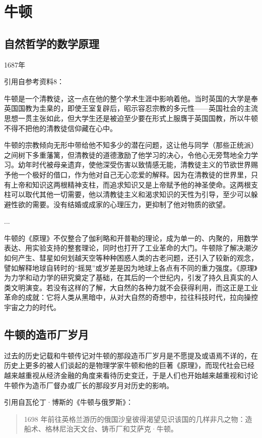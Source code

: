 \documentclass[12pt,oneside]{book}
\begin{document}
\chapter{牛顿}
\section{自然哲学的数学原理}
1687年

引用自参考资料8：
\begin{mdframed}
牛顿是一个清教徒，这一点在他的整个学术生涯中影响着他。当时英国的大学是奉英国国教为圭臬的，即使王室复辟后，昭示容忍宗教的多元性——英国社会的主流思想一贯主张如此，但大学生还是被迫至少要在形式上服膺于英国国教，所以牛顿不得不把他的清教徒信仰藏在心中。

牛顿的宗教倾向无形中带给他不知多少的潜在问题，这让他与同学（那些正统派）之间树下多重藩篱，但清教徒的道德激励了他学习的决心，令他心无旁骛地全力学习。幼年时代被母亲遗弃，使他深受伤害以致情感无能，清教徒主义的节欲世界赐予他一个极好的借口，作为他对自己无心恋爱的解释。因为在清教徒的世界里，只有上帝和知识这两根精神支柱，而追求知识又是上帝赋予他的神圣使命。这两根支柱可以取代其他一切需要，他以清教徒主义和渴求知识的天性为引导，至少可以躲避性欲的需要。没有结婚或成家的心理压力，更抑制了他对物质的欲望。

...


牛顿的《原理》不仅整合了伽利略和开普勒的理论，成为单一的、内聚的，用数学表达、用实验支持的整套理论，同时也打开了工业革命的大门。牛顿除了解决潮汐如何产生、彗星如何划越天空等种种困惑人类的古老问题，还引入了较新的观念，譬如解释地球自转时的“摇晃”或岁差是因为地球上各点有不同的重力强度。《原理》为力学和动力学的研究奠定了基础，在其后的一个世纪内，引发了持久且真实的人类文明演变。若没有这样的了解，大自然的各种力就不会获得利用，而这正是工业革命的成就：它将人类从黑暗中，从对大自然的奇想中，拉往科技时代，拉向操控宇宙之力的时代。


\end{mdframed}




\section{牛顿的造币厂岁月}
过去的历史记载和牛顿传记对牛顿的那段造币厂岁月是不愿提及或语焉不详的，在历史上更多的被人们谈起的是物理学家牛顿和他的巨著《原理》，而现代社会已经越来越重视从经济金融的角度来看待历史变迁，于是人们也开始越来越重视和讨论牛顿作为造币厂督办或厂长的那段岁月对历史的影响。

引用自瓦伦丁·博斯的《牛顿与俄罗斯》：
\begin{quotation}
1698 年前往英格兰游历的俄国沙皇彼得渴望见识该国的几样非凡之物：造船术、格林尼治天文台、铸币厂和艾萨克·牛顿。
\end{quotation}
\end{document}
